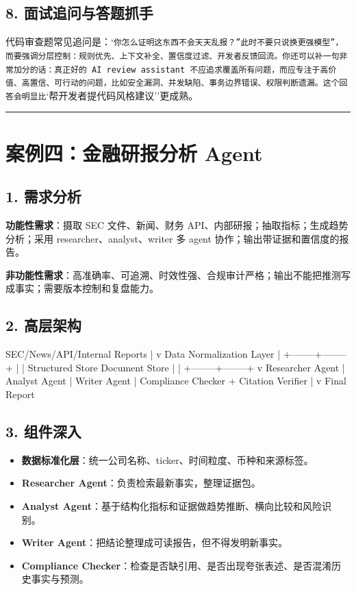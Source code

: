 \subsection{8. 面试追问与答题抓手}
代码审查题常见追问是：`\texttt{你怎么证明这东西不会天天乱报？''此时不要只说}\texttt{换更强模型''，而要强调分层控制：规则优先、上下文补全、置信度过滤、开发者反馈回流。你还可以补一句非常加分的话：真正好的 AI review assistant 不应追求覆盖所有问题，而应专注于高价值、高置信、可行动的问题，比如安全漏洞、并发缺陷、事务边界错误、权限判断遗漏。这个回答会明显比}`帮开发者提代码风格建议''更成熟。


\bigskip\hrule\bigskip

\section{案例四：金融研报分析 Agent}

\subsection{1. 需求分析}
\textbf{功能性需求}：摄取 SEC 文件、新闻、财务 API、内部研报；抽取指标；生成趋势分析；采用 researcher、analyst、writer 多 agent 协作；输出带证据和置信度的报告。


\textbf{非功能性需求}：高准确率、可追溯、时效性强、合规审计严格；输出不能把推测写成事实；需要版本控制和复盘能力。


\subsection{2. 高层架构}
\begin{codeblock}
SEC/News/API/Internal Reports
            |
            v
      Data Normalization Layer
            |
   +--------+--------+
   |                 |
Structured Store   Document Store
   |                 |
   +--------+--------+
            v
      Researcher Agent
            |
      Analyst Agent
            |
       Writer Agent
            |
  Compliance Checker + Citation Verifier
            |
            v
         Final Report
\end{codeblock}

\subsection{3. 组件深入}
\begin{itemize}[leftmargin=2em]
\item \textbf{数据标准化层}：统一公司名称、ticker、时间粒度、币种和来源标签。
\item \textbf{Researcher Agent}：负责检索最新事实，整理证据包。
\item \textbf{Analyst Agent}：基于结构化指标和证据做趋势推断、横向比较和风险识别。
\item \textbf{Writer Agent}：把结论整理成可读报告，但不得发明新事实。
\item \textbf{Compliance Checker}：检查是否缺引用、是否出现夸张表述、是否混淆历史事实与预测。
\end{itemize}

